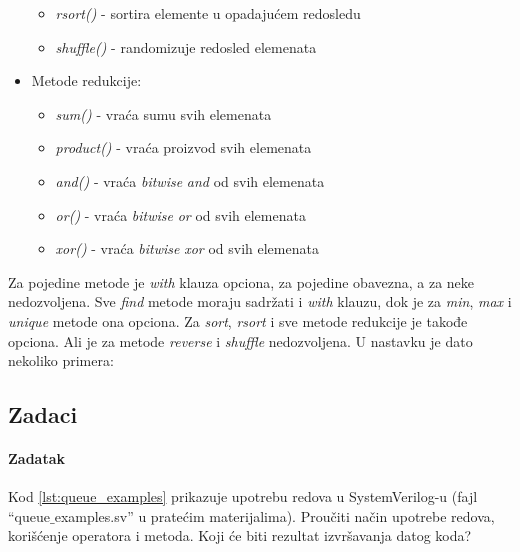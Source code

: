 \begin{itemize}
\begin{itemize}
  \item \emph{rsort()} - sortira elemente u opadajućem redosledu
  \item \emph{shuffle()} - randomizuje redosled elemenata
  \end{itemize}
\item Metode redukcije:
  \begin{itemize}
  \item \emph{sum()} - vraća sumu svih elemenata
  \item \emph{product()} - vraća proizvod svih elemenata
  \item \emph{and()} - vraća \emph{bitwise} \emph{and} od svih elemenata
  \item \emph{or()} - vraća \emph{bitwise} \emph{or} od svih elemenata
  \item \emph{xor()} - vraća \emph{bitwise} \emph{xor} od svih elemenata
  \end{itemize}
\end{itemize}

Za pojedine metode je \emph{with} klauza opciona, za pojedine obavezna, a za
neke nedozvoljena.
Sve \emph{find} metode moraju sadržati i \emph{with} klauzu, dok je za
\emph{min}, \emph{max} i \emph{unique} metode ona opciona.
Za \emph{sort}, \emph{rsort} i sve metode redukcije je takođe opciona.
Ali je za metode \emph{reverse} i \emph{shuffle} nedozvoljena.
U nastavku je dato nekoliko primera:



\subsection{Zadaci}

\paragraph{Zadatak}

Kod \ref{lst:queue_examples} prikazuje upotrebu redova u SystemVerilog-u (fajl
``queue\(\_\)examples.sv'' u pratećim materijalima).
Proučiti način upotrebe redova, korišćenje operatora i metoda. 
Koji će biti rezultat izvršavanja datog koda?





